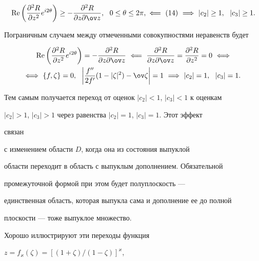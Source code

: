\begin{note}
\begin{gather*}
\re\bigg(\frac{\partial^2R}{\partial z^2}e^{i2\theta} 


\bigg)\ge-\frac{\partial^2R}{\partial z\partial\ov z}, 


\ \ 0\le\theta\le2\pi,\ \Longleftarrow\ (14) 


\ \Longrightarrow \ |c_2|\ge1,\ \ |c_3|\ge1. 


\end{gather*} 


 


Пограничным случаем между отмеченными совокупностями неравенств будет 


\begin{multline*} 


\re\bigg(\frac{\partial^2R}{\partial z^2}e^{i2\theta}\bigg)=- 


\frac{\partial^2R}{\partial z\partial\ov z}\ \Longleftarrow 


\ \frac{\partial^2R}{\partial z\partial\ov z}= 


\frac{\partial^2R}{\partial z^2}=0\ \Longleftrightarrow \\


\Longleftrightarrow \ \{f,\zeta\}=0,\ \ \bigg|\frac{f''}{2f'} 


(1-|\zeta|^2)-\ov\zeta\bigg|=1\ \Longrightarrow\  


|c_2|=1,\ \ |c_3|=1. 


\end{multline*} 


 


Тем самым получается переход от оценок $|c_2|<1$, $|c_3|<1$ к оценкам 


$|c_2|>1$, $|c_3|>1$ через равенства $|c_2|=1$, $|c_3|=1$. Этот эффект 


связан 


с изменением области $D$, когда она из состояния выпуклой 


области переходит в область с выпуклым дополнением. Обязательной 


промежуточной формой при этом будет полуплоскость --- 


единственная область, которая выпукла сама и дополнение ее до полной 


плоскости --- тоже выпуклое множество. 


 


Хорошо иллюстрируют эти переходы функция 


$z=f_\varkappa(\zeta)=[(1+\zeta)/(1-\zeta)]^\varkappa$, 



\end{note}
